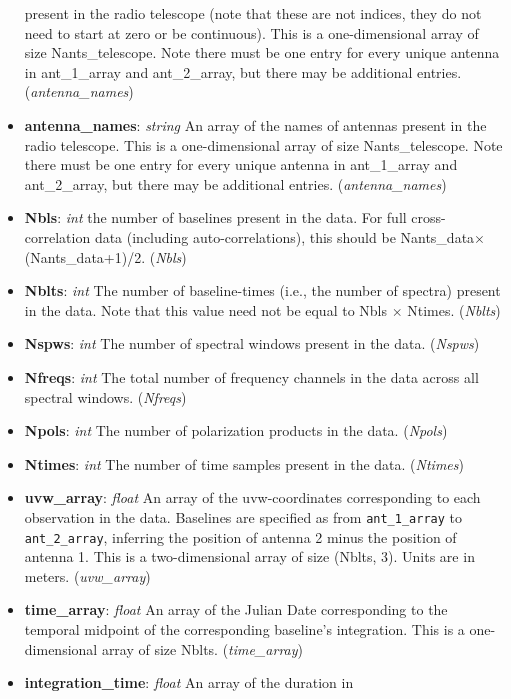 \documentclass[11pt, oneside]{article}
\begin{document}
\begin{itemize}
  present in the radio telescope (note that these are not indices, they do not need to start at zero
  or be continuous). This is a one-dimensional array of size
  Nants\_telescope. Note there must be one entry for every unique antenna in
  ant\_1\_array and ant\_2\_array, but there may be additional
  entries. (\textit{antenna\_names})
\item \textbf{antenna\_names}: \textit{string} An array of the names of antennas
  present in the radio telescope. This is a one-dimensional array of size
  Nants\_telescope. Note there must be one entry for every unique antenna in
  ant\_1\_array and ant\_2\_array, but there may be additional
  entries. (\textit{antenna\_names})
\item \textbf{Nbls}: \textit{int} the number of baselines present in the
  data. For full cross-correlation data (including auto-correlations), this
  should be Nants\_data$\times$(Nants\_data+1)/2. (\textit{Nbls})
\item \textbf{Nblts}: \textit{int} The number of baseline-times (i.e., the
  number of spectra) present in the data. Note that this value need not be equal
  to Nbls $\times$ Ntimes. (\textit{Nblts})
\item \textbf{Nspws}: \textit{int} The number of spectral windows present in the
  data. (\textit{Nspws})
\item \textbf{Nfreqs}: \textit{int} The total number of frequency channels in
  the data across all spectral windows. (\textit{Nfreqs})
\item \textbf{Npols}: \textit{int} The number of polarization products in the
  data. (\textit{Npols})
\item \textbf{Ntimes}: \textit{int} The number of time samples present in the
  data. (\textit{Ntimes})
\item \textbf{uvw\_array}: \textit{float} An array of the uvw-coordinates
  corresponding to each observation in the data. Baselines are specified as from
  \verb+ant_1_array+ to \verb+ant_2_array+, inferring the position of antenna 2
  minus the position of antenna 1. This is a two-dimensional array of size
  (Nblts, 3). Units are in meters. (\textit{uvw\_array})
\item \textbf{time\_array}: \textit{float} An array of the Julian Date
  corresponding to the temporal midpoint of the corresponding baseline's
  integration. This is a one-dimensional array of size
  Nblts. (\textit{time\_array})
\item \textbf{integration\_time}: \textit{float} An array of the duration in

\end{itemize}
\end{document}
